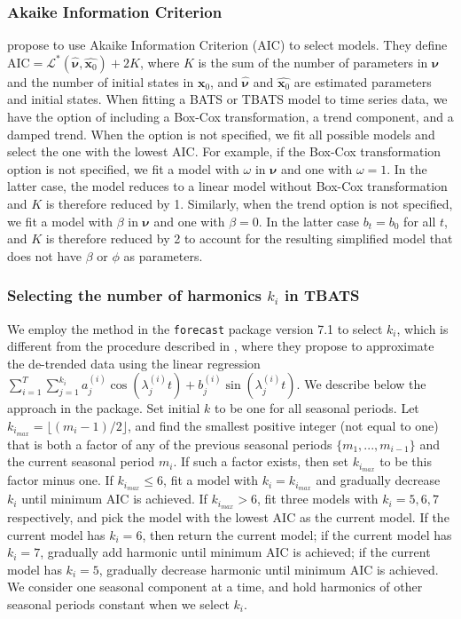 \documentclass{uwstat572}
\begin{document}
\subsubsection{Akaike Information Criterion}
\hspace{4ex}\citet{de2011forecasting} propose to use Akaike Information Criterion (AIC) to select models. They define AIC$=\mathcal{L}^{*}(\hat{\bm{\nu}},\hat{\textbf{x}_0})+2K$, where $K$ is the sum of the number of parameters in $\bm{\nu}$ and the number of initial states in $\textbf{x}_0$, and $\hat{\bm{\nu}}$ and $\hat{\textbf{x}_0}$ are estimated parameters and initial states. When fitting a BATS or TBATS model to time series data, we have the option of including a Box-Cox transformation, a trend component, and a damped trend. When the option is not specified, we fit all possible models and select the one with the lowest AIC. For example, if the Box-Cox transformation option is not specified, we fit a model with $\omega$ in $\bm{\nu}$ and one with $\omega=1$. In the latter case, the model reduces to a linear model without Box-Cox transformation and $K$ is therefore reduced by 1. Similarly, when the trend option is not specified, we fit a model with $\beta$ in $\bm{\nu}$ and one with $\beta=0$. In the latter case $b_t=b_0$ for all $t$, and $K$ is therefore reduced by 2 to account for the resulting simplified model that does not have $\beta$ or $\phi$ as parameters.

\subsubsection{Selecting the number of harmonics $k_i$ in TBATS}
\hspace{4ex}We employ the method in the \texttt{forecast} package version 7.1 to select $k_i$, which is different from the procedure described in \citet{de2011forecasting}, where they propose to approximate the de-trended data using the linear regression $\sum\limits_{i=1}^T \sum\limits_{j=1}^{k_i} a_j^{(i)}\cos (\lambda_j^{(i)}t)+ b_j^{(i)} \sin (\lambda_j^{(i)}t)$. We describe below the approach in the package. Set initial $k$ to be one for all seasonal periods. Let $k_{i_{max}}=\lfloor(m_i-1)/2 \rfloor$, and find the smallest positive integer (not equal to one) that is both a factor of any of the previous seasonal periods $\{ m_1,...,m_{i-1} \}$ and the current seasonal period $m_i$. If such a factor exists, then set $k_{i_{max}}$ to be this factor minus one. If $k_{i_{max}} \leq 6$, fit a model with $k_i=k_{i_{max}}$ and gradually decrease $k_i$ until minimum AIC is achieved. If $k_{i_{max}} > 6$, fit three models with $k_i=5,6,7$ respectively, and pick the model with the lowest AIC as the current model. If the current model has $k_i=6$, then return the current model; if the current model has $k_i=7$, gradually add harmonic until minimum AIC is achieved; if the current model has $k_i=5$, gradually decrease harmonic until minimum AIC is achieved. We consider one seasonal component at a time, and hold harmonics of other seasonal periods constant when we select $k_i$.
\end{document}

